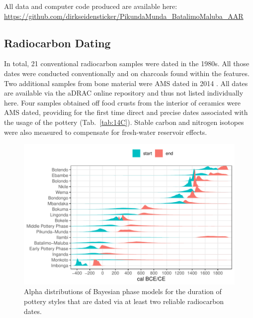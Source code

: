 \documentclass[smallextended,natbib]{svjour3}       %
\begin{document}
All data and computer code produced are available here: \url{https://github.com/dirkseidensticker/PikundaMunda_BatalimoMaluba_AAR}

\subsection*{Radiocarbon Dating}

In total, 21 conventional radiocarbon samples were dated in the 1980s. All those dates were conducted conventionally and on charcoals found within the features. Two additional samples from bone material were AMS dated in 2014 \citep[355--356 Appendix 2]{Seidensticker.2021e}. All dates are available via the aDRAC online repository \citep[\url{https://github.com/dirkseidensticker/aDRAC};][]{Seidensticker.2021f} and thus not listed individually here. Four samples obtained off food crusts from the interior of ceramics were AMS dated, providing for the first time direct and precise dates associated with the usage of the pottery (Tab.~\ref{tab:14C}). Stable carbon and nitrogen isotopes were also measured to compensate for fresh-water reservoir effects.

\begin{figure}[!tbp]
	\centering
	\includegraphics[width=\textwidth]{fig/fig_bayesphases.pdf}
	\caption{Alpha distributions of Bayesian phase models for the duration of pottery styles \citep{Crema.2020a,Crema.2021a} that are dated via at least two reliable radiocarbon dates.}
	\label{fig:bayes}
\end{figure}
\end{document}

